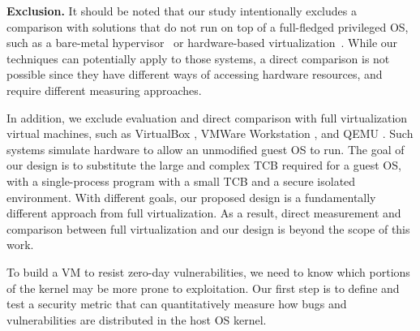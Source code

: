 \noindent
\textbf{Exclusion.}
It should be noted that our study intentionally excludes %
a comparison with solutions that do not run on top of a
full-fledged privileged OS, such as
a bare-metal hypervisor~\cite{Xen-03, VMWare-Server} or
hardware-based virtualization~\cite{IntelVT, keller2010nohype}.
While our techniques can potentially apply to those
systems, a direct comparison is not possible since they have different
ways of accessing hardware resources, and require different measuring approaches.

In addition, we exclude evaluation and direct comparison with full virtualization virtual machines,
such as VirtualBox \cite{VirtualBox}, VMWare Workstation \cite{VMWare-Workstation}, and QEMU \cite{QEMU}.
Such systems simulate hardware to allow an unmodified guest OS to run. The goal
of our design is to substitute the large and complex TCB required for a guest OS, with a single-process
program with a small TCB and a secure isolated environment. With different goals, our proposed design is 
a fundamentally different approach from full virtualization. As a result, direct measurement and comparison between full virtualization
and our design is
beyond the scope of this work.

To build a VM to resist zero-day vulnerabilities, we need to know which
portions of the kernel may be more prone to exploitation. Our first step is to
define and test a security metric that can quantitatively measure how bugs and
vulnerabilities are distributed in the host OS kernel.

